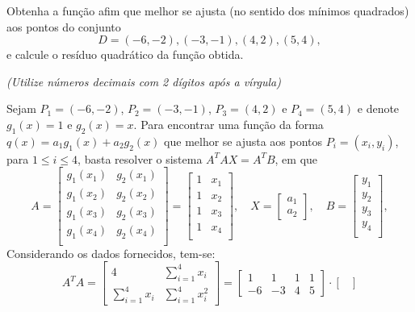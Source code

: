 \documentclass[12pt,a4paper]{article}
\begin{document}
\begin{ExerciseList}
\Exercise[title={2,0}] Obtenha a função afim que melhor se ajusta (no sentido dos mínimos quadrados) aos pontos do conjunto
\[
D = {(-6, -2), (-3, -1), (4, 2), (5, 4)},
\]
e calcule o resíduo quadrático da função obtida.

{\color{blue} \textit{(Utilize números decimais com 2 dígitos após a vírgula)}}

\Answer Sejam $P_1 = (-6, -2)$, $P_2 = (-3, -1)$, $P_3 = (4, 2)$ e $P_4 = (5, 4)$ e denote $g_1(x) = 1$ e $g_2(x) = x$. Para encontrar uma função da forma $q(x) = a_1 g_1(x) + a_2 g_2(x)$ que melhor se ajusta aos pontos $P_i = (x_i,y_i)$, para $1 \leq i \leq 4$, basta resolver o sistema $A^T A X = A^T B$, em que
\[
A
= \begin{bmatrix}
g_1(x_1) & g_2(x_1) \\
g_1(x_2) & g_2(x_2) \\
g_1(x_3) & g_2(x_3) \\
g_1(x_4) & g_2(x_4) \\
\end{bmatrix}
= \begin{bmatrix}
1 & x_1 \\
1 & x_2 \\
1 & x_3 \\
1 & x_4 \\
\end{bmatrix},
\quad
X =
\begin{bmatrix}
a_1\\a_2
\end{bmatrix},
\quad
B = \begin{bmatrix}
y_1 \\
y_2 \\
y_3 \\
y_4 \\
\end{bmatrix},
\]
Considerando os dados fornecidos, tem-se:
\[
A^T A
= \begin{bmatrix}
 4                  & \sum_{i=1}^4 x_i   \\
\sum_{i=1}^4 x_i    & \sum_{i=1}^4 x_i^2
\end{bmatrix}
=\begin{bmatrix}
 1 & 1 & 1 & 1 \\
-6 & -3 & 4 & 5
\end{bmatrix}
\cdot
\begin{bmatrix}

\end{bmatrix}\]
\end{ExerciseList}
\end{document}
